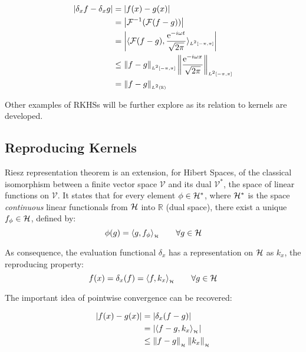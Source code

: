 \begin{subequations}
\begin{align}
\left|\delta_x f-\delta_x g\right| &= \left|f(x)-g(x)\right|\\
			  &=\left| \mathcal{F}^{-1}(\mathcal{F}(f-g)) \right|\\
			  &=\left| \langle \mathcal{F}(f-g),\frac{\mathrm{e}^{-i\omega
			  t}}{\sqrt{2\pi}}\rangle_{\scriptscriptstyle L^2[-\pi,\pi]} \right| \label{eq:cont_four}
			  \\
			  &\leq
			  \left\lVert f-g\right\rVert_{\scriptscriptstyle
			  L^2[-\pi,\pi]}\left\lVert\frac{\mathrm{e}^{-i\omega x}}{\sqrt{2\pi}}\right\rVert_{\scriptscriptstyle L^2[-\pi,\pi]} \label{eq:cont_cs} \\
			  &= \left\lVert f-g\right\rVert_{\scriptscriptstyle L^2(\mathbb{R})} \label{eq:cont_par}
\end{align}
\end{subequations}

Other examples of RKHSs will be further explore as its relation to kernels are
developed.

\subsection{Reproducing Kernels}

Riesz representation theorem is an extension, for Hibert Spaces, of the
classical isomorphism between a finite vector space $\mathcal{V}$ and its dual
$\mathcal{V}^*$, the space of linear functions on $\mathcal{V}$. It states that
for every element $\phi \in \mathcal{H}^*$, where $\mathcal{H}^*$ is the space
\textit{continuous} linear functionals from $\mathcal{H}$ into $\mathbb{R}$ (dual
space), there exist a unique $f_\phi \in \mathcal{H}$, defined by:
\begin{equation*}
\phi(g)= \langle g,f_\phi\rangle_{_{\mathcal{H}}}\qquad \forall g \in \mathcal{H}
\end{equation*}

As consequence, the evaluation functional \(\delta_x\) has a representation on
\(\mathcal{H}\) as \(k_x\), the reproducing property:
\begin{equation*}
f(x) = \delta_x(f) = \langle f,k_x\rangle_{_{\mathcal{H}}}\qquad \forall g \in \mathcal{H}
\end{equation*}

The important idea of pointwise convergence can be recovered:

\begin{subequations}
\begin{align}
\left|f(x)-g(x)\right| &= \left|\delta_x(f-g)\right|\\
			  &= \left|\langle f-g,k_x\rangle_{_{\mathcal{H}}}\right|\\
			  &\leq \left\lVert f-g\right\rVert_{_{\mathcal{H}}}\left\lVert k_x\right\rVert_{_{\mathcal{H}}}\label{eq:pw_cs_ineq}
\end{align}
\end{subequations}


